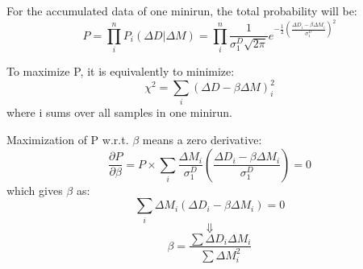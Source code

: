 For the accumulated data of one minirun, the total probability will be:
\begin{equation}
    P = \prod_i^n P_i(\Delta D|\Delta M) = \prod_i^n \frac{1}{\sigma_1^D\sqrt{2\pi}} 
	    e^{-\frac{1}{2}\left( \frac{\Delta D_i - \beta\Delta M_i}{\sigma_1^D}\right)^2}
\end{equation}

To maximize P, it is equivalently to minimize:
\begin{equation}
    \chi^2 = \sum_i (\Delta D - \beta\Delta M)_i^2
    \label{eq:regression_chi2}
\end{equation}
where i sums over all samples in one minirun.

Maximization of P w.r.t. $\beta$ means a zero derivative:
\begin{equation}
    \frac{\partial P}{\partial \beta} = P \times 
    \sum_i \frac{\Delta M_i}{\sigma_1^D} \left( \frac{\Delta D_i - \beta\Delta M_i}{\sigma_1^D}\right)
    = 0
\end{equation}
which gives $\beta$ as:
\begin{equation}
    \sum_i \Delta M_i (\Delta D_i - \beta\Delta M_i) = 0 
\end{equation}
$$ \Downarrow $$
\begin{equation}
    \beta = \frac{\sum \Delta D_i \Delta M_i}{\sum \Delta M^2_i}
\end{equation}

